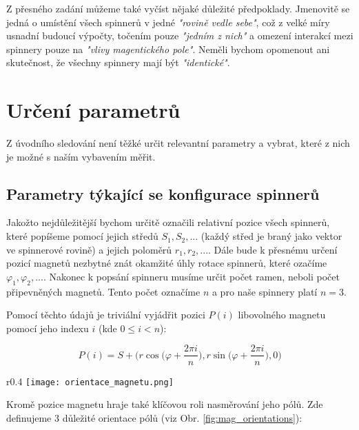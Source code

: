 \documentclass[12pt, a4paper,
 twoside,        %
 openright
]{report}
\begin{document}
Z přesného zadání můžeme také vyčíst nějaké důležité předpoklady.
Jmenovitě se jedná o
umístění všech spinnerů v jedné \textit{"rovině vedle sebe"}, což z velké míry usnadní budoucí výpočty,
točením pouze \textit{"jedním z nich"} a
omezení interakcí mezi spinnery pouze na \textit{"vlivy magentického pole"}.
Neměli bychom opomenout ani skutečnost, že všechny spinnery mají být \textit{"identické"}.

\section{Určení parametrů}

Z úvodního sledování není těžké určit relevantní parametry a vybrat, které z nich je možné s naším vybavením měřit.

\subsection{Parametry týkající se konfigurace spinnerů}
Jakožto nejdůležitější bychom určitě označili relativní pozice všech spinnerů, které popíšeme pomocí jejich středů $S_1, S_2,...$ (každý střed je braný jako vektor ve spinnerové rovině) a jejich poloměrů $r_1, r_2, ...$.
Dále bude k přesnému určení pozicí magnetů nezbytné znát okamžité úhly rotace spinnerů, které ozačíme $\varphi_1, \varphi_2,...$.
Nakonec k popsání spinneru musíme určit počet ramen, neboli počet připevněných magnetů. Tento počet označíme $n$ a pro naše spinnery platí $n=3$.

Pomocí těchto údajů je triviální vyjádřit pozici $P(i)$ libovolného magnetu pomocí jeho indexu $i$ (kde $0 \leq i < n$):

\begin{equation}
    \label{eq:magnet_pos}
    P(i) = S + \biggr(r\cos{\bigg(\varphi + \frac{2\pi i}{n}\bigg)},
    r\sin{\bigg(\varphi+\frac{2\pi i}{n}}\bigg), 0 \bigg)
\end{equation}

\begin{wrapfigure}{r}{0.4\textwidth}
    \vspace*{-0.5cm}
    \texttt{[image: orientace\_magnetu.png]}
    \centering
    \caption{Tři námi vyhranění orientace magnetů}
    \label{fig:mag_orientations}
\end{wrapfigure}

Kromě pozice magnetu hraje také klíčovou roli nasměrování jeho pólů. Zde definujeme 3 důležité orientace pólů (viz Obr. \ref{fig:mag_orientations}):
\end{document}
